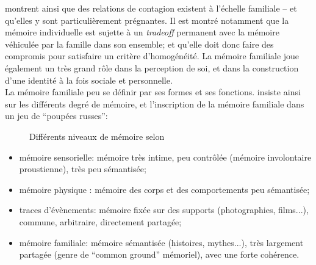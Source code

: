 \documentclass[french]{article}
\begin{document}
			\cite{muxel2012a,boesen2012,garstenauer2012} montrent ainsi que des relations de contagion existent à l'échelle familiale -- et qu'elles y sont particulièrement prégnantes. Il est montré notamment que la mémoire individuelle est sujette à un \textit{tradeoff} permanent avec la mémoire véhiculée par la famille dans son ensemble; et qu'elle doit donc faire des compromis pour satisfaire un critère d'homogénéité. La mémoire familiale joue également un très grand rôle dans la perception de soi, et dans la construction d'une identité à la fois sociale et personnelle.\\
			La mémoire familiale peu se définir par ses formes et ses fonctions. \cite{muxel2012a} insiste ainsi sur les différents degré de mémoire, et l'inscription de la mémoire familiale dans un jeu de ``poupées russes'':
			\begin{figure}[H]
				\centering
				\caption{Différents niveaux de mémoire selon \cite{muxel2012a}}
			\end{figure}
			\begin{itemize}
				\item mémoire sensorielle: mémoire très intime, peu contrôlée (mémoire involontaire proustienne), très peu sémantisée;
				\item mémoire physique : mémoire des corps et des comportements peu sémantisée;
				\item traces d'évènements: mémoire fixée sur des supports (photographies, films...), commune, arbitraire, directement partagée;
				\item mémoire familiale: mémoire sémantisée (histoires, mythes...), très largement partagée (genre de ``common ground'' mémoriel), avec une forte cohérence.
			\end{itemize}
\end{document}
